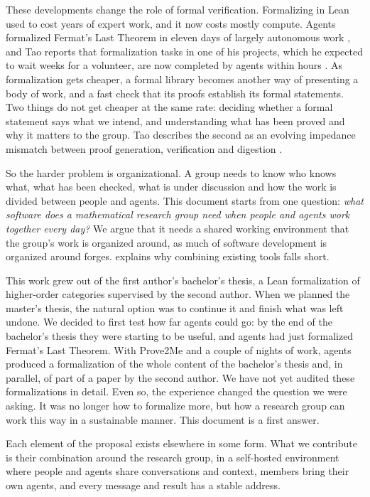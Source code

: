\documentclass{article}
\begin{document}
These developments change the role of formal verification. Formalizing in Lean used to cost years of expert work, and it now costs mostly compute. Agents formalized Fermat's Last Theorem in eleven days of largely autonomous work \cite{anthropic2026flt}, and Tao reports that formalization tasks in one of his projects, which he expected to wait weeks for a volunteer, are now completed by agents within hours \cite{tao2026ieantn}. As formalization gets cheaper, a formal library becomes another way of presenting a body of work, and a fast check that its proofs establish its formal statements. Two things do not get cheaper at the same rate: deciding whether a formal statement says what we intend, and understanding what has been proved and why it matters to the group. Tao describes the second as an evolving impedance mismatch between proof generation, verification and digestion \cite{tao2026ieantn}.

So the harder problem is organizational. A group needs to know who knows what, what has been checked, what is under discussion and how the work is divided between people and agents. This document starts from one question: \emph{what software does a mathematical research group need when people and agents work together every day?} We argue that it needs a shared working environment that the group's work is organized around, as much of software development is organized around forges.  explains why combining existing tools falls short.

This work grew out of the first author's bachelor's thesis, a Lean formalization of higher-order categories supervised by the second author. When we planned the master's thesis, the natural option was to continue it and finish what was left undone. We decided to first test how far agents could go: by the end of the bachelor's thesis they were starting to be useful, and agents had just formalized Fermat's Last Theorem. With Prove2Me \cite{prove2me2026} and a couple of nights of work, agents produced a formalization of the whole content of the bachelor's thesis and, in parallel, of part of a paper by the second author. We have not yet audited these formalizations in detail. Even so, the experience changed the question we were asking. It was no longer how to formalize more, but how a research group can work this way in a sustainable manner. This document is a first answer.

Each element of the proposal exists elsewhere in some form. What we contribute is their combination around the research group, in a self-hosted environment where people and agents share conversations and context, members bring their own agents, and every message and result has a stable address.
\end{document}
